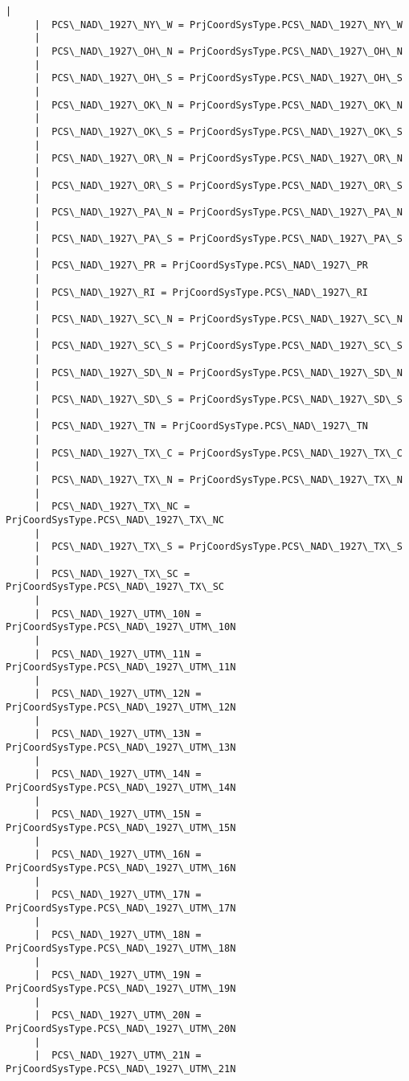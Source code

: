 \documentclass[11pt]{article}
\begin{document}
\begin{Verbatim}[commandchars=\\\{\}]
     |  
     |  PCS\_NAD\_1927\_NY\_W = PrjCoordSysType.PCS\_NAD\_1927\_NY\_W
     |  
     |  PCS\_NAD\_1927\_OH\_N = PrjCoordSysType.PCS\_NAD\_1927\_OH\_N
     |  
     |  PCS\_NAD\_1927\_OH\_S = PrjCoordSysType.PCS\_NAD\_1927\_OH\_S
     |  
     |  PCS\_NAD\_1927\_OK\_N = PrjCoordSysType.PCS\_NAD\_1927\_OK\_N
     |  
     |  PCS\_NAD\_1927\_OK\_S = PrjCoordSysType.PCS\_NAD\_1927\_OK\_S
     |  
     |  PCS\_NAD\_1927\_OR\_N = PrjCoordSysType.PCS\_NAD\_1927\_OR\_N
     |  
     |  PCS\_NAD\_1927\_OR\_S = PrjCoordSysType.PCS\_NAD\_1927\_OR\_S
     |  
     |  PCS\_NAD\_1927\_PA\_N = PrjCoordSysType.PCS\_NAD\_1927\_PA\_N
     |  
     |  PCS\_NAD\_1927\_PA\_S = PrjCoordSysType.PCS\_NAD\_1927\_PA\_S
     |  
     |  PCS\_NAD\_1927\_PR = PrjCoordSysType.PCS\_NAD\_1927\_PR
     |  
     |  PCS\_NAD\_1927\_RI = PrjCoordSysType.PCS\_NAD\_1927\_RI
     |  
     |  PCS\_NAD\_1927\_SC\_N = PrjCoordSysType.PCS\_NAD\_1927\_SC\_N
     |  
     |  PCS\_NAD\_1927\_SC\_S = PrjCoordSysType.PCS\_NAD\_1927\_SC\_S
     |  
     |  PCS\_NAD\_1927\_SD\_N = PrjCoordSysType.PCS\_NAD\_1927\_SD\_N
     |  
     |  PCS\_NAD\_1927\_SD\_S = PrjCoordSysType.PCS\_NAD\_1927\_SD\_S
     |  
     |  PCS\_NAD\_1927\_TN = PrjCoordSysType.PCS\_NAD\_1927\_TN
     |  
     |  PCS\_NAD\_1927\_TX\_C = PrjCoordSysType.PCS\_NAD\_1927\_TX\_C
     |  
     |  PCS\_NAD\_1927\_TX\_N = PrjCoordSysType.PCS\_NAD\_1927\_TX\_N
     |  
     |  PCS\_NAD\_1927\_TX\_NC = PrjCoordSysType.PCS\_NAD\_1927\_TX\_NC
     |  
     |  PCS\_NAD\_1927\_TX\_S = PrjCoordSysType.PCS\_NAD\_1927\_TX\_S
     |  
     |  PCS\_NAD\_1927\_TX\_SC = PrjCoordSysType.PCS\_NAD\_1927\_TX\_SC
     |  
     |  PCS\_NAD\_1927\_UTM\_10N = PrjCoordSysType.PCS\_NAD\_1927\_UTM\_10N
     |  
     |  PCS\_NAD\_1927\_UTM\_11N = PrjCoordSysType.PCS\_NAD\_1927\_UTM\_11N
     |  
     |  PCS\_NAD\_1927\_UTM\_12N = PrjCoordSysType.PCS\_NAD\_1927\_UTM\_12N
     |  
     |  PCS\_NAD\_1927\_UTM\_13N = PrjCoordSysType.PCS\_NAD\_1927\_UTM\_13N
     |  
     |  PCS\_NAD\_1927\_UTM\_14N = PrjCoordSysType.PCS\_NAD\_1927\_UTM\_14N
     |  
     |  PCS\_NAD\_1927\_UTM\_15N = PrjCoordSysType.PCS\_NAD\_1927\_UTM\_15N
     |  
     |  PCS\_NAD\_1927\_UTM\_16N = PrjCoordSysType.PCS\_NAD\_1927\_UTM\_16N
     |  
     |  PCS\_NAD\_1927\_UTM\_17N = PrjCoordSysType.PCS\_NAD\_1927\_UTM\_17N
     |  
     |  PCS\_NAD\_1927\_UTM\_18N = PrjCoordSysType.PCS\_NAD\_1927\_UTM\_18N
     |  
     |  PCS\_NAD\_1927\_UTM\_19N = PrjCoordSysType.PCS\_NAD\_1927\_UTM\_19N
     |  
     |  PCS\_NAD\_1927\_UTM\_20N = PrjCoordSysType.PCS\_NAD\_1927\_UTM\_20N
     |  
     |  PCS\_NAD\_1927\_UTM\_21N = PrjCoordSysType.PCS\_NAD\_1927\_UTM\_21N

\end{Verbatim}
\end{document}

